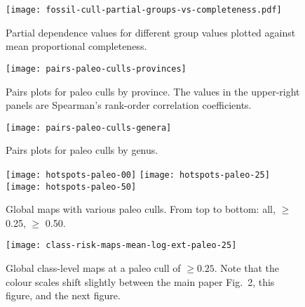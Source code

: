 \documentclass[11pt]{article}
\begin{document}
\clearpage

\begin{figure}[htbp]
\begin{center}
\texttt{[image: fossil-cull-partial-groups-vs-completeness.pdf]}
\caption{Partial dependence values for different group values plotted against mean proportional completeness.}
\label{fig:ext-prop-compl-scatter}
\end{center}
\end{figure}

\clearpage

\begin{figure}[htbp]
\begin{center}
\texttt{[image: pairs-paleo-culls-provinces]}
\caption{Pairs plots for paleo culls by province. The values in the upper-right panels are Spearman's rank-order correlation coefficients.}
\label{fig:pairs-prov-paleo-culls}
\end{center}
\end{figure}

\clearpage

\begin{figure}[htbp]
\begin{center}
\texttt{[image: pairs-paleo-culls-genera]}
\caption{Pairs plots for paleo culls by genus.}
\label{fig:pairs-genus-paleo-culls}
\end{center}
\end{figure}

\clearpage

\begin{figure}[htbp]
\begin{center}
\texttt{[image: hotspots-paleo-00]}
\texttt{[image: hotspots-paleo-25]}
\texttt{[image: hotspots-paleo-50]}
\caption{Global maps with various paleo culls. From top to bottom: all, $\ge$ 0.25, $\ge$ 0.50.}
\label{fig:overall-maps-paleo-culls}
\end{center}
\end{figure}

\begin{figure}[htbp]
\begin{center}
\texttt{[image: class-risk-maps-mean-log-ext-paleo-25]}
\caption{Global class-level maps at a paleo cull of $\ge 0.25$. Note that the colour scales shift slightly between the main paper Fig.\ 2, this figure, and the next figure.}
\label{fig:class-maps-paleo-cull-0.25}
\end{center}
\end{figure}
\end{document}
